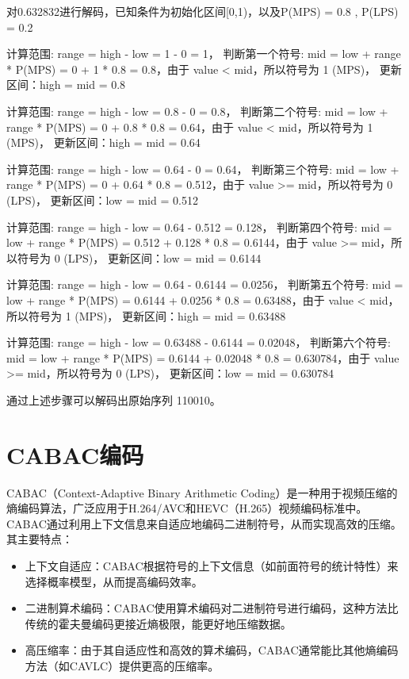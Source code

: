 \documentclass{/Users/hi/Study/template/code}
\begin{document}
\begin{tcolorbox}
	\small
	对0.632832进行解码，已知条件为初始化区间[0,1)，以及P(MPS) = 0.8 , P(LPS) = 0.2
	\begin{serialNumber}
		\item 计算范围: range = high - low = 1 - 0 = 1，
		判断第一个符号: mid = low + range * P(MPS) = 0 + 1 * 0.8 = 0.8，由于 value < mid，所以符号为 1 (MPS)，
		更新区间：high = mid = 0.8

		\item 计算范围: range = high - low = 0.8 - 0 = 0.8，
		判断第二个符号: mid = low + range * P(MPS) = 0 + 0.8 * 0.8 = 0.64，由于 value < mid，所以符号为 1 (MPS)，
		更新区间：high = mid = 0.64
		\item 计算范围: range = high - low = 0.64 - 0 = 0.64，
		判断第三个符号: mid = low + range * P(MPS) = 0 + 0.64 * 0.8 = 0.512，由于 value >= mid，所以符号为 0 (LPS)，
		更新区间：low = mid = 0.512

		\item 计算范围: range = high - low = 0.64 - 0.512 = 0.128，
		判断第四个符号: mid = low + range * P(MPS) = 0.512 + 0.128 * 0.8 = 0.6144，由于 value >= mid，所以符号为 0 (LPS)，
		更新区间：low = mid = 0.6144

		\item 计算范围: range = high - low = 0.64 - 0.6144 = 0.0256，
		判断第五个符号: mid = low + range * P(MPS) = 0.6144 + 0.0256 * 0.8 = 0.63488，由于 value < mid，所以符号为 1 (MPS)，
		更新区间：high = mid = 0.63488

		\item 计算范围: range = high - low = 0.63488 - 0.6144 = 0.02048，
		判断第六个符号: mid = low + range * P(MPS) = 0.6144 + 0.02048 * 0.8 = 0.630784，由于 value >= mid，所以符号为 0 (LPS)，
		更新区间：low = mid = 0.630784
	\end{serialNumber}

	通过上述步骤可以解码出原始序列 110010。
\end{tcolorbox}


\newpage
\section{CABAC编码}
CABAC（Context-Adaptive Binary Arithmetic Coding）是一种用于视频压缩的熵编码算法，广泛应用于H.264/AVC和HEVC（H.265）视频编码标准中。CABAC通过利用上下文信息来自适应地编码二进制符号，从而实现高效的压缩。其主要特点：
\begin{itemize}
	\item 上下文自适应：CABAC根据符号的上下文信息（如前面符号的统计特性）来选择概率模型，从而提高编码效率。
	\item 二进制算术编码：CABAC使用算术编码对二进制符号进行编码，这种方法比传统的霍夫曼编码更接近熵极限，能更好地压缩数据。
	\item 高压缩率：由于其自适应性和高效的算术编码，CABAC通常能比其他熵编码方法（如CAVLC）提供更高的压缩率。
\end{itemize}
\end{document}
